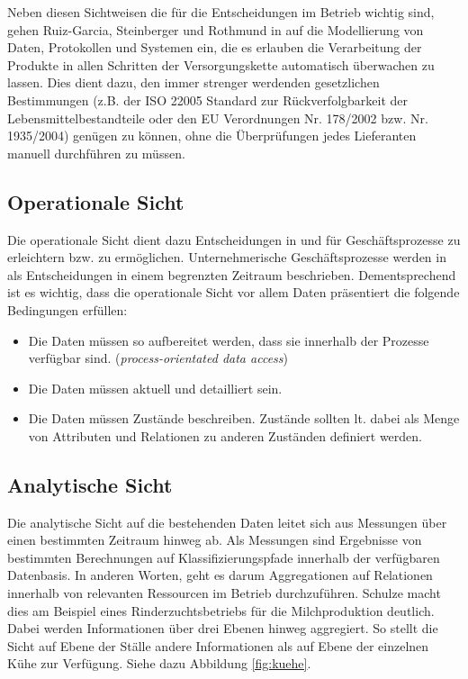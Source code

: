 Neben diesen Sichtweisen die für die Entscheidungen im Betrieb wichtig sind, gehen Ruiz-Garcia, Steinberger und Rothmund in \cite{jour:Ruiz-Garcia2010} auf die Modellierung von Daten, Protokollen und Systemen ein, die es erlauben die Verarbeitung der Produkte in allen Schritten der Versorgungskette automatisch überwachen zu lassen. Dies dient dazu, den immer strenger werdenden gesetzlichen Bestimmungen (z.B. der ISO 22005 Standard zur Rückverfolgbarkeit der Lebensmittelbestandteile oder den EU Verordnungen Nr. 178/2002 bzw. Nr. 1935/2004) genügen zu können, ohne die Überprüfungen jedes Lieferanten manuell durchführen zu müssen.

\subsection{Operationale Sicht}
Die operationale Sicht dient dazu Entscheidungen in und für Geschäftsprozesse zu erleichtern bzw. zu ermöglichen. Unternehmerische Geschäftsprozesse werden in \cite{jour:Schulze2007} als Entscheidungen in einem begrenzten Zeitraum beschrieben. Dementsprechend ist es wichtig, dass die operationale Sicht vor allem Daten präsentiert die folgende Bedingungen erfüllen:

\begin{itemize}
	\item Die Daten müssen so aufbereitet werden, dass sie innerhalb der Prozesse verfügbar sind. (\textit{process-orientated data access})
	\item Die Daten müssen aktuell und detailliert sein.
	\item Die Daten müssen Zustände beschreiben. Zustände sollten lt. \cite{jour:Schulze2007} dabei als Menge von Attributen und Relationen zu anderen Zuständen definiert werden.
\end{itemize}

\subsection{Analytische Sicht}
Die analytische Sicht auf die bestehenden Daten leitet sich aus Messungen über einen bestimmten Zeitraum hinweg ab. Als Messungen sind Ergebnisse von bestimmten Berechnungen auf Klassifizierungspfade innerhalb der verfügbaren Datenbasis. In anderen Worten, geht es darum Aggregationen auf Relationen innerhalb von relevanten Ressourcen im Betrieb durchzuführen. Schulze macht dies am Beispiel eines Rinderzuchtsbetriebs für die Milchproduktion deutlich. Dabei werden Informationen über drei Ebenen hinweg aggregiert. So stellt die Sicht auf Ebene der Ställe andere Informationen als auf Ebene der einzelnen Kühe zur Verfügung. Siehe dazu Abbildung \ref{fig:kuehe}. 

